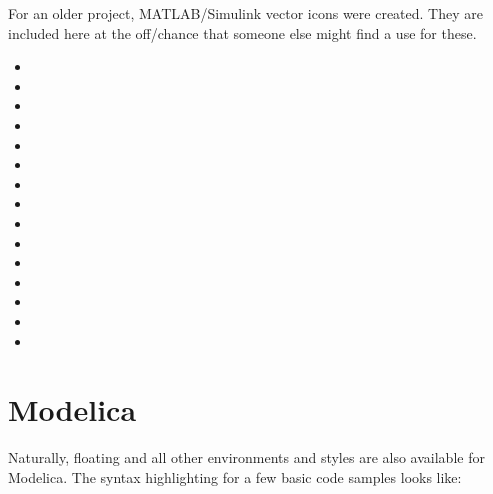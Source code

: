For an older project, MATLAB/Simulink vector icons were created.
They are included here at the off\-/chance that someone else might find a use for these.
\begin{itemize}
    \item {}
    \item {}
    \item {}
    \item {}
    \item {}
    \item {}
    \item {}
    \item {}
    \item {}
    \item {}
    \item {}
    \item {}
    \item {}
    \item {}
    \item {}
\end{itemize}

\section{Modelica}

Naturally, floating and all other environments and styles are also available for
Modelica.
The syntax highlighting for a few basic code samples \autocite{wikipedia_modelica_2020} looks like:


